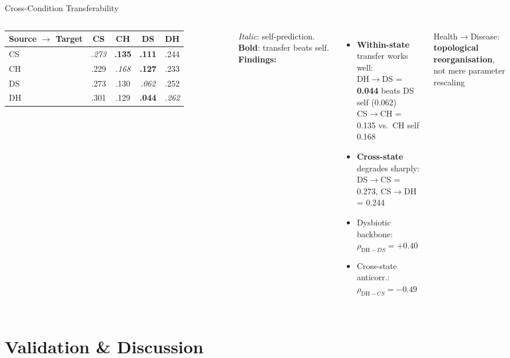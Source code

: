 \documentclass[aspectratio=169,10pt]{beamer}
\newcommand{\hlnum}[1]{\textcolor{ikm}{\textbf{#1}}}
\begin{document}
\begin{frame}[t]{Cross-Condition Transferability}
  \small
  \begin{columns}[T]
      \centering
      \vspace{4pt}
      \begin{tabular}{@{}l cccc@{}}
        \toprule
        \small Source $\to$ Target & CS & CH & DS & DH \\
        \midrule
        CS & \textit{.273} & \textbf{.135} & \textbf{.111} & .244 \\
        CH & .229 & \textit{.168} & \textbf{.127} & .233 \\
        DS & .273 & .130 & \textit{.062} & .252 \\
        DH & .301 & .129 & \textbf{.044} & \textit{.262} \\
        \bottomrule
      \end{tabular}
      \vspace{3pt}
      {\scriptsize \textit{Italic}: self-prediction.\quad
       \textbf{Bold}: transfer beats self.}
      \textbf{Findings:}
      \begin{itemize}\setlength{\itemsep}{3pt}
        \item \textbf{Within-state} transfer works well:\\
              DH$\to$DS = \hlnum{0.044} beats DS self (0.062)\\
              CS$\to$CH = 0.135 vs.\ CH self 0.168
        \item \textbf{Cross-state} degrades sharply:\\
              DS$\to$CS = 0.273, CS$\to$DH = 0.244
        \item Dysbiotic backbone: $\rho_{\mathrm{DH}-DS}=+0.40$
        \item Cross-state anticorr.: $\rho_{\mathrm{DH}-CS}=-0.49$
      \end{itemize}
      \vspace{5pt}
      \begin{alertblock}{}
        Health$\to$Disease: \textbf{topological reorganisation},\\
        not mere parameter rescaling
      \end{alertblock}
  \end{columns}
\end{frame}

\section{Validation \& Discussion}
\end{document}
